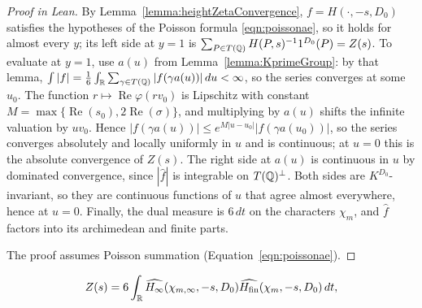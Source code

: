 \begin{proof}[Proof in Lean]

\leanok


By Lemma~\ref{lemma:heightZetaConvergence}, $f=H(\cdot,-s,D_0)$ satisfies the hypotheses of the Poisson formula \eqref{eqn:poissonae}, so it holds for almost every $y$; its left side at $y=1$ is $\sum_{P\in T(\mathbb{Q})}H(P,s)^{-1}1^{D_0}(P)=Z(s)$. To evaluate at $y=1$, use $a(u)$ from Lemma~\ref{lemma:KprimeGroup}: by that lemma, $\int|f|=\tfrac16\int_{\mathbb{R}}\sum_{\gamma\in T(\mathbb{Q})}|f(\gamma a(u))|\,du<\infty$, so the series converges at some $u_0$. The function $r\mapsto\operatorname{Re}\varphi(rv_0)$ is Lipschitz with constant $M=\max\{\operatorname{Re}(s_0),2\operatorname{Re}(\sigma)\}$, and multiplying by $a(u)$ shifts the infinite valuation by $uv_0$. Hence $|f(\gamma a(u))|\leq e^{M|u-u_0|}|f(\gamma a(u_0))|$, so the series converges absolutely and locally uniformly in $u$ and is continuous; at $u=0$ this is the absolute convergence of $Z(s)$. The right side at $a(u)$ is continuous in $u$ by dominated convergence, since $|\widehat f|$ is integrable on $T(\mathbb{Q})^\perp$. Both sides are $K^{D_0}$-invariant, so they are continuous functions of $u$ that agree almost everywhere, hence at $u=0$. Finally, the dual measure is $6\,dt$ on the characters $\chi_m$, and $\widehat f$ factors into its archimedean and finite parts.

The proof assumes Poisson summation (Equation~\ref{eqn:poissonae}).

\end{proof}

\begin{equationnode}

\label{eqn:poissonEulerIntegral}


\leanok



\begin{equation*} Z(s)=6\int_{\mathbb{R}} \widehat{H_\infty}(\chi_{m,\infty},-s,D_0) \widehat{H_{\mathrm{fin}}}(\chi_m,-s,D_0)\,dt, \end{equation*}

\end{equationnode}

